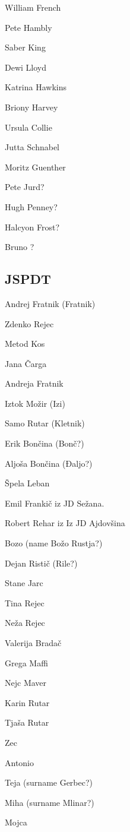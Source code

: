 \begin{tcolorbox}
\begin{fullwidth}
\begin{multicols}{2}
William French

Pete Hambly

Saber King

Dewi Lloyd

Katrina Hawkins

Briony Harvey

Ursula Collie

Jutta Schnabel

Moritz Guenther

Pete Jurd?

Hugh Penney?

Halcyon Frost?

Bruno ?





\subsection{JSPDT}

Andrej Fratnik (Fratnik)

Zdenko Rejec

Metod Kos

Jana Čarga

Andreja Fratnik

Iztok Možir (Izi)

Samo Rutar (Kletnik)

Erik Bončina (Bonč?)

Aljoša Bončina (Đaljo?)

Špela Leban

Emil Frankič iz JD Sežana.

Robert Rehar iz Iz JD Ajdovšina

Bozo (name Božo Rustja?)

Dejan Ristič (Rile?)

Stane Jarc

Tina Rejec

Neža Rejec

Valerija Bradač

Grega Maffi

Nejc Maver

Karin Rutar

Tjaša Rutar

Zec

Antonio

Teja (surname Gerbec?)

Miha (surname Mlinar?)

Mojca

 
\end{multicols} 
 \end{fullwidth} 
 \end{tcolorbox} 


